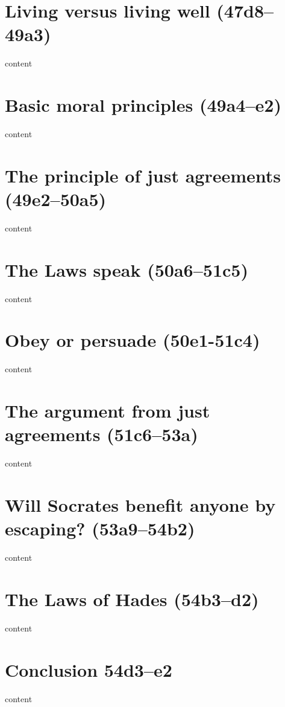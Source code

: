 \documentclass[11pt]{article}
\begin{document}
\section{Living versus living well (47d8--49a3)}

content

\section{Basic moral principles (49a4--e2)}

content

\section{The principle of just agreements (49e2--50a5)}

content

\section{The Laws speak (50a6--51c5)}

content

\section{Obey or persuade (50e1-51c4)}

content

\section{The argument from just agreements (51c6--53a)}

content

\section{Will Socrates benefit anyone by escaping? (53a9--54b2)}

content

\section{The Laws of Hades (54b3--d2)}

content

\section{Conclusion 54d3--e2}

content

\newpage


\end{document}
